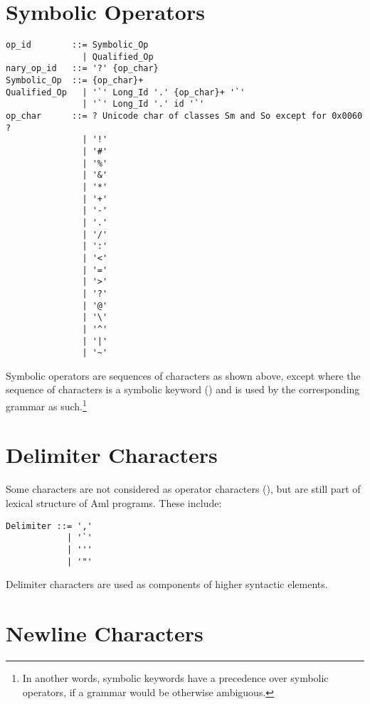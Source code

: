 \section{Symbolic Operators}
\label{sec:symbolic-operators}

\syntax\begin{lstlisting}[deletekeywords={of,and,for}]
op_id        ::= Symbolic_Op
               | Qualified_Op
nary_op_id   ::= '?' {op_char}
Symbolic_Op  ::= {op_char}+
Qualified_Op   | '`' Long_Id '.' {op_char}+ '`'
               | '`' Long_Id '.' id '`'
op_char      ::= ? Unicode char of classes Sm and So except for 0x0060 ?
               | '!'
               | '#'
               | '%'
               | '&'
               | '*'
               | '+'
               | '-'
               | '.'
               | '/'
               | ':'
               | '<'
               | '='
               | '>'
               | '?'
               | '@'
               | '\'
               | '^'
               | '|'
               | '~'
\end{lstlisting}

Symbolic operators are sequences of characters as shown above, except where the sequence of characters is a symbolic keyword () and is used by the corresponding grammar as such.\footnote{In another words, symbolic keywords have a precedence over symbolic operators, if a grammar would be otherwise ambiguous.}





\section{Delimiter Characters}
\label{sec:delimiter-characters}

Some characters are not considered as operator characters (), but are still part of lexical structure of Aml programs. These include:

\syntax\begin{lstlisting}[deletekeywords={of}]
Delimiter ::= ','
            | '`'  
            | ''' 
            | '"'
\end{lstlisting}

Delimiter characters are used as components of higher syntactic elements. 





\section{Newline Characters}
\label{sec:newlinecharacters}

